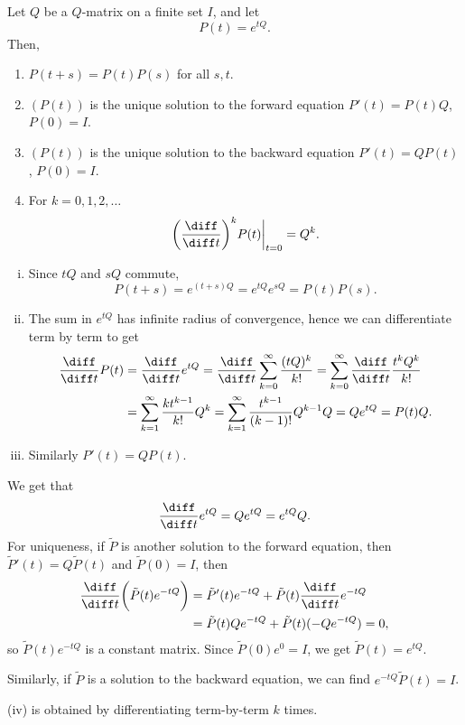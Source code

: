 \documentclass[12pt]{article}
\begin{document}
\begin{proposition}
	Let $Q$ be a $Q$-matrix on a finite set $I$, and let
	\[
	P(t) = e^{tQ}
	.\]
	Then,
	\begin{enumerate}[\normalfont(i)]
		\item $P(t+s) = P(t)P(s)$ for all $s, t$.
		\item $(P(t))$ is the unique solution to the forward equation $P'(t) = P(t)Q$, $P(0) = I$.
		\item $(P(t))$ is the unique solution to the backward equation $P'(t) = QP(t)$, $P(0) = I$.
		\item For $k = 0, 1, 2, \ldots$ 
			\[
			\biggl( \frac{\diff}{\diff t} \biggr)^{k} P(t) \biggr|_{t=0} = Q^{k}
			.\] 
	\end{enumerate}
\end{proposition}

\begin{proofbox}
	\begin{enumerate}[(i)]
		\item Since $tQ$ and $sQ$ commute,
			\[
			P(t+s) = e^{(t+s)Q} = e^{tQ}e^{sQ} = P(t)P(s)
			.\]
		\item The sum in $e^{tQ}$ has infinite radius of convergence, hence we can differentiate term by term to get
			\begin{align*}
				\frac{\diff}{\diff t} P(t) &= \frac{\diff}{\diff t} e^{tQ} = \frac{\diff}{\diff t} \sum_{k = 0}^{\infty} \frac{(tQ)^{k}}{k!} = \sum_{k = 0}^{\infty} \frac{\diff}{\diff t} \frac{t^{k}Q^{k}}{k!} \\
							   &= \sum_{k=1}^{\infty} \frac{kt^{k-1}}{k!} Q^{k} = \sum_{k = 1}^{\infty} \frac{t^{k-1}}{(k-1)!} Q^{k-1}Q = Q e^{tQ} = P(t) Q.
			\end{align*}
		\item Similarly $P'(t) = QP(t)$.
	\end{enumerate}
	We get that
	\[
	\frac{\diff}{\diff t} e^{tQ} = Q e^{tQ} = e^{tQ}Q
	.\]
	For uniqueness, if $\tilde P$ is another solution to the forward equation, then $\tilde P'(t) = Q \tilde P(t)$ and $\tilde P(0) = I$, then
	\begin{align*}
		\frac{\diff}{\diff t} \biggl( \tilde P(t) e^{-t Q} \biggr) &= \tilde P'(t) e^{-tQ} + \tilde P(t) \frac{\diff}{\diff t} e^{-tQ} \\
									   &= \tilde P(t) Qe^{-tQ} + \tilde P(t)(-Q e^{-tQ}) = 0,
	\end{align*}
	so $\tilde P(t) e^{-tQ}$ is a constant matrix. Since $\tilde P(0) e^{0} = I$, we get $\tilde P(t) = e^{tQ}$.

	Similarly, if $\tilde P$ is a solution to the backward equation, we can find $e^{-tQ} \tilde P(t) = I$.

	(iv) is obtained by differentiating term-by-term $k$ times.
\end{proofbox}
\end{document}
